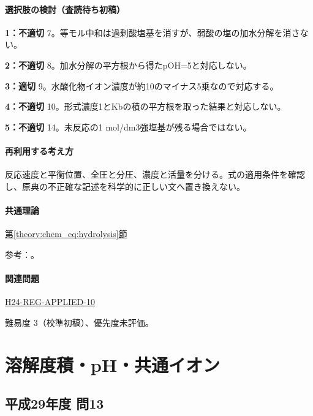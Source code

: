 \paragraph{選択肢の検討（査読待ち初稿）}\mbox{}\par

\noindent\textbf{1：不適切} 7。等モル中和は過剰酸塩基を消すが、弱酸の塩の加水分解を消さない。\par

\noindent\textbf{2：不適切} 8。加水分解の平方根から得たpOH=\allowbreak{}5と対応しない。\par

\noindent\textbf{3：適切} 9。水酸化物イオン濃度が約10のマイナス5乗なので対応する。\par

\noindent\textbf{4：不適切} 10。形式濃度1とKbの積の平方根を取った結果と対応しない。\par

\noindent\textbf{5：不適切} 14。未反応の1 mol/dm3強塩基が残る場合ではない。\par

\paragraph{再利用する考え方} 反応速度と平衡位置、全圧と分圧、濃度と活量を分ける。式の適用条件を確認し、原典の不正確な記述を科学的に正しい文へ置き換えない。

\paragraph{共通理論} \hyperref[theory:chem_eq:hydrolysis]{第\ref*{theory:chem_eq:hydrolysis}節}

\par 参考：\cite{iupac_greenbook2012,mit_buffer2008}。

\paragraph{関連問題} \hyperref[q:h24-reg-applied-10]{H24-REG-APPLIED-10}

\par 難易度 3（校準初稿）、優先度未評価。

\section{溶解度積・pH・共通イオン}

\subsection{平成29年度 問13}
\label{q:h29-reg-applied-13}

